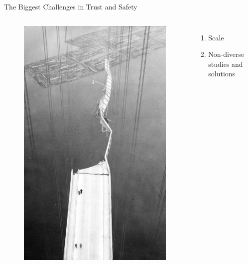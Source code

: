 \documentclass[nobackground,dvipsnames,table]{beamer}
\begin{document}
\begin{frame}{The Biggest Challenges in Trust and Safety}
        \begin{columns}
                \begin{figure}
                    \centering
                    \includegraphics[width=\textwidth]{broken-bridge.png}
                \end{figure}
                \begin{enumerate}
                    \item Scale
                    \item Non-diverse studies and solutions

\end{enumerate}
\end{columns}
\end{frame}
\end{document}
